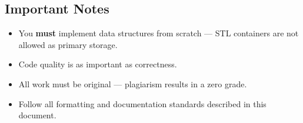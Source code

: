 \subsection{Important Notes}

\begin{itemize}
  \item You \textbf{must} implement data structures from scratch --- STL containers are not allowed as primary storage.
  \item Code quality is as important as correctness.
  \item All work must be original --- plagiarism results in a zero grade.
  \item Follow all formatting and documentation standards described in this document.
\end{itemize}
